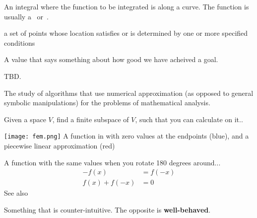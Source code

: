 \begin{definition}[Flow]
\begin{definition}[Lattice]
\end{definition}

\begin{definition}
    An integral where the function to be integrated is along a curve.
    The function is usually a~ or~.

\end{definition}

\begin{definition}[Locus]
    a set of points whose location satisfies or is determined by one or more
    specified conditions

\end{definition}

\begin{definition}
    A value that says something about how good we have acheived a goal.
\end{definition}

\begin{definition}[Moment]
    TBD.
\end{definition}

\begin{definition}
    The study of algorithms that use numerical approximation (as opposed to
    general symbolic manipulations) for the problems of mathematical analysis.

    Given a space $V$, find a finite subspace of $V$, such that you can
    calculate on it..

    \texttt{[image: fem.png]}
    A function in  with zero values at the endpoints (blue), and a piecewise
    linear approximation (red)

\end{definition}

\begin{definition}\label{oddfunc}
    A function with the same values when you rotate 180 degrees around...
    \begin{align}
        - f(x) &= f(-x) \\
        f(x) + f(-x) &= 0
    \end{align}
    See also~
\end{definition}

\begin{definition}[Pathological]
    Something that is counter-intuitive. The opposite is \textbf{well-behaved}.

\end{definition}


\end{definition}
